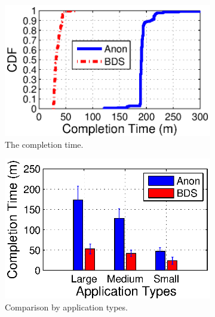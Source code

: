 \begin{figure}[t]
        \centering
        \begin{subfigure}[b]{0.3\textwidth}
                \centering
                \includegraphics[width=\textwidth]{images/BDSvsAnon_overall.eps}
                \caption{The completion time.}
                \label{fig:BDSvsAnon:overall}
        \end{subfigure}
        \begin{subfigure}[b]{0.3\textwidth}%
                \centering
                \includegraphics[width=\textwidth]{images/BDS_VS_ANON_v3.eps}
                \caption{Comparison by application types.}
                \label{fig:BDSvsAnon:FCT}
        \end{subfigure}
        \begin{subfigure}[b]{0.3\textwidth}
                \centering

\end{subfigure}
\end{figure}
